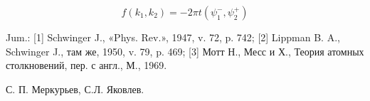 \documentclass[10pt]{article}
\begin{document}
\[

f\left(k_{1}, k_{2}\right)=-2 \pi t\left(\psi_{1}^{-}, \psi_{2}^{+}\right)

\]



Jum.: [1] Schwinger J., «Phys. Rev.», 1947, v. 72, p. 742; [2] Lippman B. A., Schwinger J., там же, 1950, v. 79, p. 469; [3] Мотт Н., Месс и Х., Теория атомных столкновений, пер. с англ., М., 1969.



С. П. Меркурьев, С.Л. Яковлев.
\end{document}
